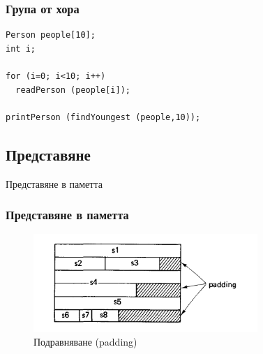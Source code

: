 \documentclass{beamer}
\begin{document}
\begin{frame}[fragile]
\frametitle{Група от хора} 


\begin{lstlisting}
Person people[10];
int i;

for (i=0; i<10; i++)
  readPerson (people[i]);

printPerson (findYoungest (people,10));

\end{lstlisting}  

\end{frame}
 

\subsection{Представяне} 

\begin{frame}
\centerline{Представяне в паметта}
\end{frame}


\begin{frame}[fragile]
\frametitle{Представяне в паметта} 

\begin{figure}
\includegraphics[width=8.5cm]{images/padding}
\caption{Подравняване (padding)\cite{wirth}}  
\end{figure}

\end{frame}
\end{document}
